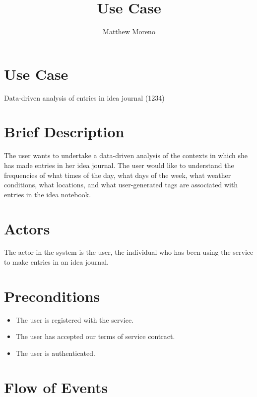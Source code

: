 \documentclass[a4paper]{article}
\title{Use Case}
\author{Matthew Moreno}
\begin{document}
\maketitle

\section{Use Case}
Data-driven analysis of entries in idea journal (1234)

\section{Brief Description}
The user wants to undertake a data-driven analysis of the contexts in which she has made entries in her idea journal. The user would like to understand the frequencies of what times of the day, what days of the week, what weather conditions, what locations, and what user-generated tags are associated with entries in the idea notebook.

\section{Actors}
The actor in the system is the user, the individual who has been using the service to make entries in an idea journal.

\section{Preconditions}
\begin{itemize}
	\item The user is registered with the service.
    \item The user has accepted our terms of service contract.
    \item The user is authenticated.
\end{itemize}

\section{Flow of Events}
\end{document}
